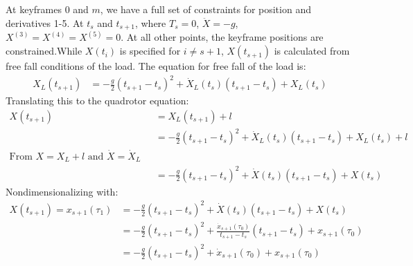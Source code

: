 \documentclass[11pt]{article}
\begin{document}
\mbox{} \newline
At keyframes $0$ and $m$, we have a full set of constraints for position and derivatives 1-5. At $t_s$ and $t_{s+1}$, where $T_{s} = 0$, $\ddot{X} = -g$, $X^{(3)} = X^{(4)} = X^{(5)} = 0$. At all other points, the keyframe positions are constrained.While $X(t_i)$ is specified for $i \ne s+1$, $X(t_{s+1})$ is calculated from free fall conditions of the load. The equation for free fall of the load is:
\begin{align*}
X_L(t_{s+1}) &= -\frac{g}{2}(t_{s+1}-t_s)^2+\dot{X}_L(t_s)(t_{s+1}-t_s) + X_L(t_s) 
\end{align*}
Translating this to the quadrotor equation: 
\begin{align*}
X(t_{s+1}) &= X_L(t_{s+1}) + l \\
&= -\frac{g}{2}(t_{s+1}-t_s)^2+\dot{X}_L(t_s)(t_{s+1}-t_s) + X_L(t_s) + l \\
\text{From $X = X_L + l$ and $\dot{X} = \dot{X}_L$ }& \\
&= -\frac{g}{2}(t_{s+1}-t_s)^2+\dot{X}(t_s)(t_{s+1}-t_s) + X(t_s)
\end{align*}
Nondimensionalizing with:
\begin{align*}
X(t_{s+1}) = x_{s+1}(\tau_1)&= -\frac{g}{2} (t_{s+1}-t_s)^2+\dot{X}(t_s)(t_{s+1}-t_s) + X(t_s) \\
&= -\frac{g}{2} (t_{s+1}-t_s)^2+\frac{ \dot{x}_{s+1}(\tau_0) } { t_{s+1}-t_s } (t_{s+1}-t_s) + x_{s+1}(\tau_0) \\
&=  -\frac{g}{2} (t_{s+1}-t_s)^2+ \dot{x}_{s+1}(\tau_0) + x_{s+1}(\tau_0) \\
\end{align*}
\end{document}
